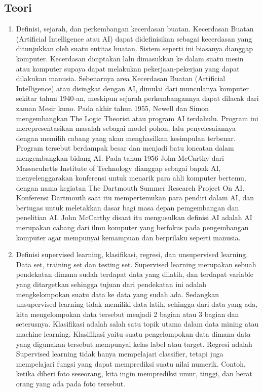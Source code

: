 \subsection{Teori}
\begin{enumerate}
\item Definisi, sejarah, dan perkembangan kecerdasan buatan.
\subitem Kecerdasan Buatan (Artificial Intelligence atau AI) dapat didefinisikan sebagai kecerdasan yang ditunjukkan oleh suatu entitas buatan. Sistem seperti ini biasanya dianggap komputer. Kecerdasan diciptakan lalu dimasukkan ke dalam suatu mesin atau komputer supaya dapat melakukan pekerjaan-pekerjan yang dapat dilakukan manusia.
\subitem Sebenarnya area Kecerdasan Buatan (Artificial Intelligence) atau disingkat dengan AI, dimulai dari munculanya komputer sekitar tahun 1940-an, meskipun sejarah perkembangannya dapat dilacak dari zaman Mesir kuno. Pada akhir tahun 1955, Newell dan Simon mengembangkan The Logic Theorist atau program AI terdahulu. Program ini merepresentasikan masalah sebagai model pohon, lalu penyelesaiannya dengan  memilih cabang yang akan menghasilkan kesimpulan terbenar. Program tersebut berdampak besar dan menjadi batu loncatan dalam mengembangkan bidang AI. Pada tahun 1956 John McCarthy dari  Massacuhetts Institute of Technology dianggap sebagai bapak AI, menyelenggarakan konferensi untuk menarik para ahli komputer bertemu, dengan  nama kegiatan The Dartmouth Summer Research Project On AI. Konferensi Dartmouth saat itu mempertemukan para pendiri dalam AI, dan bertugas untuk meletakkan dasar bagi masa depan  pemgembangan dan penelitian AI. John McCarthy  disaat itu mengusulkan definisi AI adalah AI merupakan cabang dari ilmu komputer yang berfokus pada pengembangan komputer agar mempunyai kemampuan dan berprilaku seperti manusia.
\item  Definisi supervised learning, klasifikasi, regresi, dan unsupervised learning. Data set, training set dan testing set. 
\subitem Supervised learning merupakan sebuah pendekatan dimana sudah terdapat data yang dilatih, dan terdapat variable yang ditargetkan sehingga tujuan dari pendekatan ini adalah mengkelompokan suatu data ke data yang sudah ada. Sedangkan unsupervised learning tidak memiliki data latih, sehingga dari data yang ada, kita mengelompokan data tersebut menjadi 2 bagian atau 3 bagian dan seterusnya.
\subitem Klasifikasi adalah salah satu topik utama dalam data mining atau machine learning. Klasifikasi yaitu suatu pengelompokan data dimana data yang digunakan tersebut mempunyai kelas label atau target.
\subitem Regresi adalah Supervised learning tidak hanya mempelajari classifier, tetapi juga mempelajari fungsi yang dapat memprediksi suatu nilai numerik. Contoh, ketika diberi foto seseorang, kita ingin memprediksi umur, tinggi, dan berat orang yang ada pada foto tersebut.

\end{enumerate}
